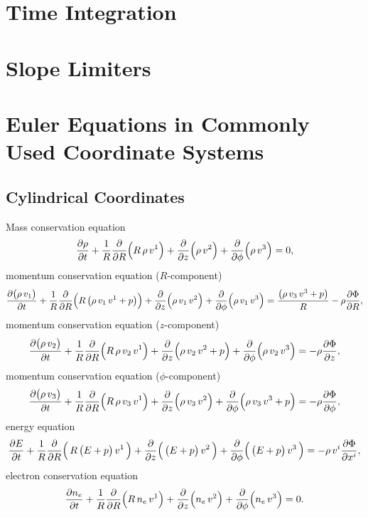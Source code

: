 \documentclass[10pt,preprint]{aastex}
\begin{document}
\section{Time Integration}

\section{Slope Limiters}




\appendix

\section{Euler Equations in Commonly Used Coordinate Systems}
\label{app:CurvilinearEuler}

\subsection{Cylindrical Coordinates}

Mass conservation equation
\begin{equation}
  \frac{\partial \rho}{\partial t}
  +\frac{1}{R}\frac{\partial }{\partial R}\Big(R\,\rho\,v^{1}\Big)
  +\frac{\partial }{\partial z}\Big(\rho\,v^{2}\Big)
  +\frac{\partial }{\partial \phi}\Big(\rho\,v^{3}\Big)=0,
\end{equation}
momentum conservation equation ($R$-component)
\begin{equation}
  \frac{\partial \big(\rho\,v_{1}\big)}{\partial t}
  +\frac{1}{R}\frac{\partial }{\partial R}\Big(R\,\big(\rho\,v_{1}\,v^{1}+p\big)\Big)
  +\frac{\partial }{\partial z}\Big(\rho\,v_{1}\,v^{2}\Big)
  +\frac{\partial }{\partial \phi}\Big(\rho\,v_{1}\,v^{3}\Big)
  =\frac{\big(\rho\,v_{3}\,v^{3}+p\big)}{R}-\rho\frac{\partial \Phi}{\partial R},
\end{equation}
momentum conservation equation ($z$-component)
\begin{equation}
  \frac{\partial \big(\rho\,v_{2}\big)}{\partial t}
  +\frac{1}{R}\frac{\partial }{\partial R}\Big(R\,\rho\,v_{2}\,v^{1}\Big)
  +\frac{\partial }{\partial z}\Big(\rho\,v_{2}\,v^{2}+p\Big)
  +\frac{\partial }{\partial \phi}\Big(\rho\,v_{2}\,v^{3}\Big)=-\rho\frac{\partial \Phi}{\partial z},
\end{equation}
momentum conservation equation ($\phi$-component)
\begin{equation}
  \frac{\partial \big(\rho\,v_{3}\big)}{\partial t}
  +\frac{1}{R}\frac{\partial }{\partial R}\Big(R\,\rho\,v_{3}\,v^{1}\Big)
  +\frac{\partial }{\partial z}\Big(\rho\,v_{3}\,v^{2}\Big)
  +\frac{\partial }{\partial \phi}\Big(\rho\,v_{3}\,v^{3}+p\Big)
  =-\rho\frac{\partial \Phi}{\partial \phi},
\end{equation}
energy equation
\begin{equation}
  \frac{\partial E}{\partial t}+\frac{1}{R}\frac{\partial }{\partial R}\Big(\,R\,\big(E+p\big)\,v^{1}\,\Big)+\frac{\partial }{\partial z}\Big(\,\big(E+p\big)\,v^{2}\,\Big)+\frac{\partial }{\partial \phi}\Big(\,\big(E+p\big)\,v^{3}\,\Big)=-\rho\,v^{i}\frac{\partial \Phi}{\partial x^{i}},
\end{equation}
electron conservation equation
\begin{equation}
  \frac{\partial n_{e}}{\partial t}
  +\frac{1}{R}\frac{\partial }{\partial R}\Big(R\,n_{e}\,v^{1}\Big)
  +\frac{\partial }{\partial z}\Big(n_{e}\,v^{2}\Big)
  +\frac{\partial }{\partial \phi}\Big(n_{e}\,v^{3}\Big)=0.  
\end{equation}
\end{document}
